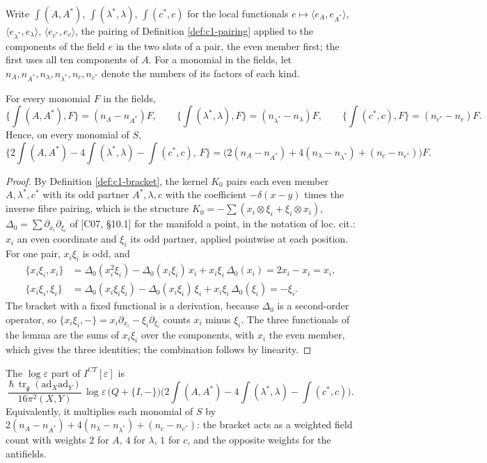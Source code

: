 Write $\int(A,A^*)$, $\int(\lambda^*,\lambda)$, $\int(c^*,c)$ for the local functionals $e\mapsto\langle e_A,e_{A^*}\rangle$, $\langle e_{\lambda^*},e_\lambda\rangle$, $\langle e_{c^*},e_c\rangle$, the pairing of Definition \ref{def:c1-pairing} applied to the components of the field $e$ in the two slots of a pair, the even member first; the first uses all ten components of $A$. For a monomial in the fields, let $n_A,n_{A^*},n_\lambda,n_{\lambda^*},n_c,n_{c^*}$ denote the numbers of its factors of each kind.

\begin{lemma}
\label{lem:c4-count}
For every monomial $F$ in the fields,
\[
\Big\{\int(A,A^*),F\Big\}=(n_A-n_{A^*})F,\qquad \Big\{\int(\lambda^*,\lambda),F\Big\}=(n_{\lambda^*}-n_\lambda)F,\qquad \Big\{\int(c^*,c),F\Big\}=(n_{c^*}-n_c)F .
\]
Hence, on every monomial of $S$,
\[
\Big\{2\int(A,A^*)-4\int(\lambda^*,\lambda)-\int(c^*,c),\,F\Big\}=\big(2(n_A-n_{A^*})+4(n_\lambda-n_{\lambda^*})+(n_c-n_{c^*})\big)F .
\]
\end{lemma}

\begin{proof}
By Definition \ref{def:c1-bracket}, the kernel $K_0$ pairs each even member $A,\lambda^*,c^*$ with its odd partner $A^*,\lambda,c$ with the coefficient $-\delta(x-y)$ times the inverse fibre pairing, which is the structure $K_0=-\sum(x_i\otimes\xi_i+\xi_i\otimes x_i)$, $\Delta_0=\sum\partial_{x_i}\partial_{\xi_i}$ of [C07, §10.1] for the manifold a point, in the notation of loc. cit.: $x_i$ an even coordinate and $\xi_i$ its odd partner, applied pointwise at each position. For one pair, $x_i\xi_i$ is odd, and
\[
\begin{aligned}
\{x_i\xi_i,x_i\}&=\Delta_0(x_i^2\xi_i)-\Delta_0(x_i\xi_i)\,x_i+x_i\xi_i\,\Delta_0(x_i)=2x_i-x_i=x_i,\\
\{x_i\xi_i,\xi_i\}&=\Delta_0(x_i\xi_i\xi_i)-\Delta_0(x_i\xi_i)\,\xi_i+x_i\xi_i\,\Delta_0(\xi_i)=-\xi_i .
\end{aligned}
\]
The bracket with a fixed functional is a derivation, because $\Delta_0$ is a second-order operator, so $\{x_i\xi_i,-\}=x_i\partial_{x_i}-\xi_i\partial_{\xi_i}$ counts $x_i$ minus $\xi_i$. The three functionals of the lemma are the sums of $x_i\xi_i$ over the components, with $x_i$ the even member, which gives the three identities; the combination follows by linearity.
\end{proof}

\begin{theorem}
\label{thm:c4-log}
The $\log\varepsilon$ part of $I^{CT}[\varepsilon]$ is
\begin{equation}
\frac{\hbar\,\operatorname{tr}_{\mathfrak g}(\mathrm{ad}_X\mathrm{ad}_Y)}{16\pi^2(X,Y)}\,\log\varepsilon\,\big(Q+\{I,-\}\big)\Big(2\int(A,A^*)-4\int(\lambda^*,\lambda)-\int(c^*,c)\Big).
\label{eq:c4-log}
\end{equation}
Equivalently, it multiplies each monomial of $S$ by $2(n_A-n_{A^*})+4(n_\lambda-n_{\lambda^*})+(n_c-n_{c^*})$: the bracket acts as a weighted field count with weights $2$ for $A$, $4$ for $\lambda$, $1$ for $c$, and the opposite weights for the antifields.
\end{theorem}

